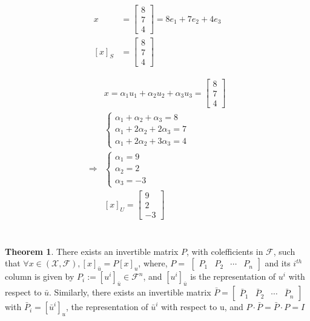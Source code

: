 \documentclass{article}
\theoremstyle{definition} %
\newtheorem{theorem}{Theorem}[section]
\begin{document}
\begin{align*}
    x &= 
    \begin{bmatrix}
        8 \\ 7 \\ 4
    \end{bmatrix}
    = 8e_1 + 7e_2 + 4e_3
    \\
    [x]_S &= 
    \begin{bmatrix}
        8 \\ 7 \\ 4        
    \end{bmatrix}
\end{align*}

\begin{align*}
    &x = \alpha_1 u_1 + \alpha_2 u_2 + \alpha_3 u_3 = 
    \begin{bmatrix}
        8 \\ 7 \\ 4
    \end{bmatrix}
    \\
    &\left\{
        \begin{array}{lll}
            \alpha_1 + \alpha_2 + \alpha_3 = 8\\
            \alpha_1 + 2\alpha_2 + 2\alpha_3 = 7\\
            \alpha_1 + 2\alpha_2 + 3\alpha_3 = 4
        \end{array}
    \right. 
    \\
    \Rightarrow
    &\left\{
        \begin{array}{lll}
            \alpha_1 = 9\\
            \alpha_2 = 2\\
            \alpha_3 = -3
        \end{array}
    \right. 
    \\
    &[x]_U = 
    \begin{bmatrix}
        9 \\ 2 \\ -3
    \end{bmatrix}
\end{align*}

\section{}
\begin{theorem}
    There exists an invertible matrix $P$, with colefficients in $\mathcal{F}$, such that $\forall x \in(\mathcal{X}, \mathcal{F}),[x]_{\bar{u}}=P[x]_u$, where, $P=$ $\left[\begin{array}{llll}P_1 & P_2 & \cdots & P_n\end{array}\right]$ and its $i^{t h}$ column is given by $P_i:=\left[u^i\right]_{\bar{u}} \in \mathcal{F}^n$, and $\left[u^i\right]_{\bar{u}}$ is the representation of $u^i$ with respect to $\bar{u}$. Similarly, there exists an invertible matrix $\bar{P}=\left[\begin{array}{llll}\bar{P}_1 & \bar{P}_2 & \cdots & \bar{P}_n\end{array}\right]$ with $\bar{P}_i=\left[\bar{u}^i\right]_u$, the representation of $\bar{u}^i$ with respect to u, and $P \cdot \bar{P}=\bar{P} \cdot P=I$
\end{theorem}
\end{document}
